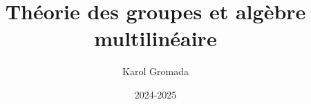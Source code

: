 \newcommand{\R}{\ensuremath{\mathbb{R}}}
\newcommand{\Z}{\ensuremath{\mathbb{Z}}}
\newcommand{\N}{\ensuremath{\mathbb{N}}}
\newcommand{\K}{\ensuremath{\mathbb{K}}}
\newcommand{\ra}{\ensuremath{\rightarrow}}
\newcommand{\lra}{\ensuremath{\longrightarrow}}


\renewcommand{\b}[1]{\ensuremath{\mathbf{#1}}}

\newcommand{\ps}[2]{\ensuremath{\prescript{}{#1}{#2}}}


\DeclareMathOperator{\rang}{rang\hspace{0.8pt}}
\newcommand{\id}[1][]{\ensuremath{\mathrm{Id_{#1}}}}
\DeclareMathOperator{\aut}{Aut}
\DeclareMathOperator{\supp}{supp}
\DeclareMathOperator{\sym}{Sym}
\DeclareMathOperator{\dist}{dist}
\DeclareMathOperator{\im}{Im}
\DeclareMathOperator{\ev}{ev}
\DeclareMathOperator{\sgn}{sgn}

\renewcommand{\hom}{\ensuremath{\mathrm{Hom}}}
\renewcommand{\L}{\ensuremath{\mathcal{L}}}

\newcommand{\verteq}{\rotatebox{90}{$\,=$}}
\newcommand{\equalto}[2]{\underset{\scriptstyle\overset{\mkern4mu\verteq}{#2}}{#1}}


\newcommand{\class}[1]{\ensuremath{\mathscr{C}^{#1}}}

\DeclareMathOperator{\lenop}{\mathbf{L}}
\newcommand{\len}[2]{\ensuremath{\lenop_{#1}^{#2}}}

\DeclarePairedDelimiter{\abs}{\lvert}{\rvert}%
\DeclarePairedDelimiter{\norm}{\lVert}{\rVert}%

\newcommand{\deriv}[1]{\ensuremath{\frac{\mathrm{d}}{\mathrm{d}#1}}}
\newcommand{\defeq}{\stackrel{\text{def}}{=}}


\title{\headingfont Théorie des groupes et algèbre multilinéaire}	
\author{Karol Gromada}
\date{2024-2025}

